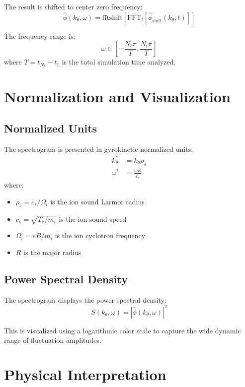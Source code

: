 \documentclass[11pt,a4paper]{article}
\begin{document}
The result is shifted to center zero frequency:
\begin{equation}
\hat{\phi}(k_\theta, \omega) = \text{fftshift}\left[\text{FFT}_t[\hat{\phi}_{\text{shift}}(k_\theta, t)]\right]
\end{equation}

The frequency range is:
\begin{equation}
\omega \in \left[-\frac{N_t \pi}{T}, \frac{N_t \pi}{T}\right]
\end{equation}
where $T = t_{N_t} - t_1$ is the total simulation time analyzed.

\section{Normalization and Visualization}

\subsection{Normalized Units}

The spectrogram is presented in gyrokinetic normalized units:
\begin{align}
k_\theta^* &= k_\theta \rho_s \\
\omega^* &= \frac{\omega R}{c_s}
\end{align}
where:
\begin{itemize}
    \item $\rho_s = c_s / \Omega_i$ is the ion sound Larmor radius
    \item $c_s = \sqrt{T_e / m_i}$ is the ion sound speed
    \item $\Omega_i = eB / m_i$ is the ion cyclotron frequency
    \item $R$ is the major radius
\end{itemize}

\subsection{Power Spectral Density}

The spectrogram displays the power spectral density:
\begin{equation}
S(k_\theta, \omega) = |\hat{\phi}(k_\theta, \omega)|^2
\end{equation}

This is visualized using a logarithmic color scale to capture the wide dynamic range of fluctuation amplitudes.

\section{Physical Interpretation}
\end{document}

